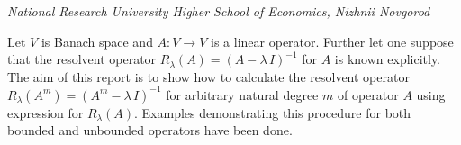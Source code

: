 

\begin{center}
	\maketitle
	{\large\textit{National Research University Higher School of Economics, Nizhnii Novgorod}}
\end{center}

Let $V$ is Banach space and $A:V\rightarrow V$ is a linear operator. Further let one suppose that the resolvent operator 
$R_\lambda(A)=(A-\lambda\, I)^{-1}$ for $A$ is known explicitly. The aim of this report is to show how to calculate the resolvent operator
$R_\lambda(A^m)=(A^m-\lambda\, I)^{-1}$ for arbitrary natural degree $m$ of operator $A$ using expression for $R_\lambda(A)$. Examples demonstrating this procedure for both bounded and unbounded operators have been done.



